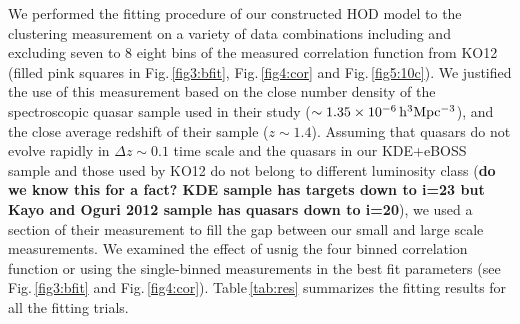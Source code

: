 \documentclass[useAMS,usenatbib]{mn2e}
\begin{document}
We performed the fitting procedure of our constructed HOD model to the 
clustering measurement on a variety of data combinations including and excluding 
seven to 8 eight bins of the measured correlation function from KO12 (filled pink 
squares in Fig.\,\ref{fig3:bfit}, Fig.\,\ref{fig4:cor} and 
Fig.\,\ref{fig5:10c}). We justified the use of this measurement based on the 
close number density of the spectroscopic quasar sample used in their study 
($\sim1.35 \times 10^{-6} \, \rm h^3 Mpc^{-3}$), and the close average redshift 
of their sample ($z\sim1.4$). Assuming that quasars do not evolve rapidly in 
$\Delta z \sim 0.1$ time scale and the quasars in our KDE+eBOSS sample and those 
used by KO12 do not belong to different luminosity class ({\bf do we know 
this for a fact? KDE sample has targets down to i=23 but Kayo and Oguri 2012 
sample has quasars down to i=20}), we used a section of their measurement to fill 
the gap between our small and large scale measurements. We examined the effect 
of usnig the four binned correlation function or using the single-binned 
measurements in the best fit parameters (see Fig.\,\ref{fig3:bfit} and 
Fig.\,\ref{fig4:cor}). Table\,\ref{tab:res} summarizes the fitting results for 
all the fitting trials. 
\end{document}

